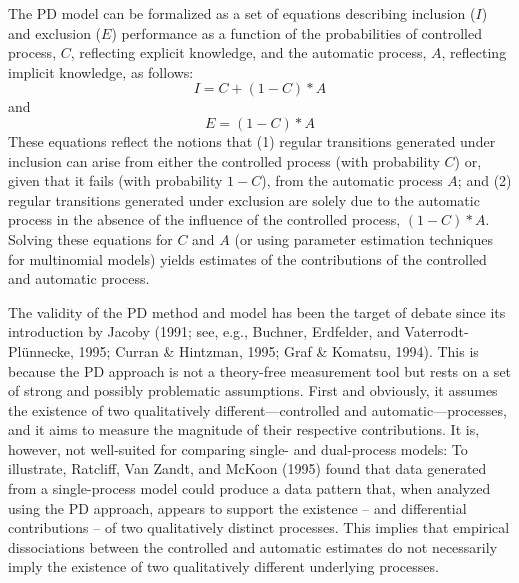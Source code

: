 \documentclass[man]{apa6}
\theoremstyle{definition}
\theoremstyle{definition}
\theoremstyle{definition}
\theoremstyle{remark}
\begin{document}
The PD model can be formalized as a set of equations describing
inclusion (\(I\)) and exclusion (\(E\)) performance as a function of the
probabilities of controlled process, \(C\), reflecting explicit
knowledge, and the automatic process, \(A\), reflecting implicit
knowledge, as follows: \[I=C+(1-C)*A\] and \[E=(1-C)*A\] These equations
reflect the notions that (1) regular transitions generated under
inclusion can arise from either the controlled process (with probability
\(C\)) or, given that it fails (with probability \(1-C\)), from the
automatic process \(A\); and (2) regular transitions generated under
exclusion are solely due to the automatic process in the absence of the
influence of the controlled process, \((1-C)*A\). Solving these
equations for \(C\) and \(A\) (or using parameter estimation techniques
for multinomial models) yields estimates of the contributions of the
controlled and automatic process.

The validity of the PD method and model has been the target of debate
since its introduction by Jacoby (1991; see, e.g., Buchner, Erdfelder,
and Vaterrodt-Plünnecke, 1995; Curran \& Hintzman, 1995; Graf \&
Komatsu, 1994). This is because the PD approach is not a theory-free
measurement tool but rests on a set of strong and possibly problematic
assumptions. First and obviously, it assumes the existence of two
qualitatively different---controlled and automatic---processes, and it
aims to measure the magnitude of their respective contributions. It is,
however, not well-suited for comparing single- and dual-process models:
To illustrate, Ratcliff, Van Zandt, and McKoon (1995) found that data
generated from a single-process model could produce a data pattern that,
when analyzed using the PD approach, appears to support the existence --
and differential contributions -- of two qualitatively distinct
processes. This implies that empirical dissociations between the
controlled and automatic estimates do not necessarily imply the
existence of two qualitatively different underlying processes.
\end{document}
